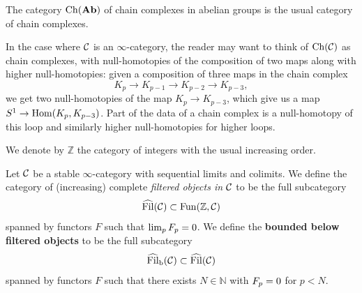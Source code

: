 \begin{exmp*}
    The category $\operatorname{Ch}(\mathbf{Ab})$ of chain complexes in abelian groups is the usual category of chain complexes.
\end{exmp*}
\begin{rem}\label{rem:higher_ch}
    In the case where $\mathcal{C}$ is an $\infty$-category, the reader may want to think of $\operatorname{Ch}(\mathcal{C})$ as chain complexes, with null-homotopies of the composition of two maps along with higher null-homotopies: given a composition of three maps in the chain complex
    \begin{equation*}
        K_p \to K_{p-1} \to K_{p-2} \to K_{p-3},
    \end{equation*}
    we get two null-homotopies of the map $K_p \to K_{p-3}$, which give us a map $S^1 \to \operatorname{Hom}(K_p,K_{p-3})$. Part of the data of a chain complex is a null-homotopy of this loop and similarly higher null-homotopies for higher loops.
\end{rem}

\begin{defn}
    We denote by $\mathbb{Z}$ the category of integers with the usual increasing order.
\end{defn}

\begin{defn}\label{def:Filb}
    Let $\mathcal{C}$ be a stable $\infty$-category with sequential limits and colimits. We define the category of (increasing) complete \emph{filtered objects in $\mathcal{C}$} to be the full subcategory
    \begin{equation*}
        \operatorname{\widehat{Fil}}(\mathcal{C}) \subset \operatorname{Fun}(\mathbb{Z},\mathcal{C})
    \end{equation*}
    spanned by functors $F$ such that $\lim_p F_p = 0$. We define the \textbf{bounded below filtered objects} to be the full subcategory
    \begin{equation*}
        \operatorname{\operatorname{\widehat{Fil}}_b}(\mathcal{C}) \subset \operatorname{\widehat{Fil}}(\mathcal{C})
    \end{equation*}
    spanned by functors $F$ such that there exists $N \in \mathbb{N}$ with $F_p = 0$ for $p < N$.
\end{defn}

